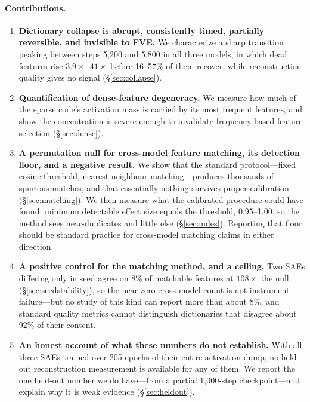 \documentclass[11pt]{article}
\begin{document}
\paragraph{Contributions.}
\begin{enumerate}
  \item \textbf{Dictionary collapse is abrupt, consistently timed, partially
    reversible, and invisible to FVE.} We characterize a sharp transition peaking
    between steps 5,200 and 5,800 in all three models, in which dead features rise
    $3.9\times$--$41\times$ before 16--57\% of them recover, while reconstruction
    quality gives no signal (\S\ref{sec:collapse}).
  \item \textbf{Quantification of dense-feature degeneracy.} We measure how much of the
    sparse code's activation mass is carried by its most frequent features, and show
    the concentration is severe enough to invalidate frequency-based feature selection
    (\S\ref{sec:dense}).
  \item \textbf{A permutation null for cross-model feature matching, its detection
    floor, and a negative result.} We show that the standard protocol---fixed cosine
    threshold, nearest-neighbour matching---produces thousands of spurious matches, and
    that essentially nothing survives proper calibration (\S\ref{sec:matching}). We then
    measure what the calibrated procedure could have found: minimum detectable effect
    size equals the threshold, 0.95--1.00, so the method sees near-duplicates and little
    else (\S\ref{sec:mdes}). Reporting that floor should be standard practice for
    cross-model matching claims in either direction.
  \item \textbf{A positive control for the matching method, and a ceiling.} Two SAEs
    differing only in seed agree on 8\% of matchable features at $108\times$ the null
    (\S\ref{sec:seedstability}), so the near-zero cross-model count is not instrument
    failure---but no study of this kind can report more than about 8\%, and standard
    quality metrics cannot distinguish dictionaries that disagree about 92\% of their
    content.
  \item \textbf{An honest account of what these numbers do not establish.} With all
    three SAEs trained over 205 epochs of their entire activation dump, no held-out
    reconstruction measurement is available for any of them. We report the one held-out
    number we do have---from a partial 1{,}000-step checkpoint---and explain why it is
    weak evidence (\S\ref{sec:heldout}).
\end{enumerate}
\end{document}
